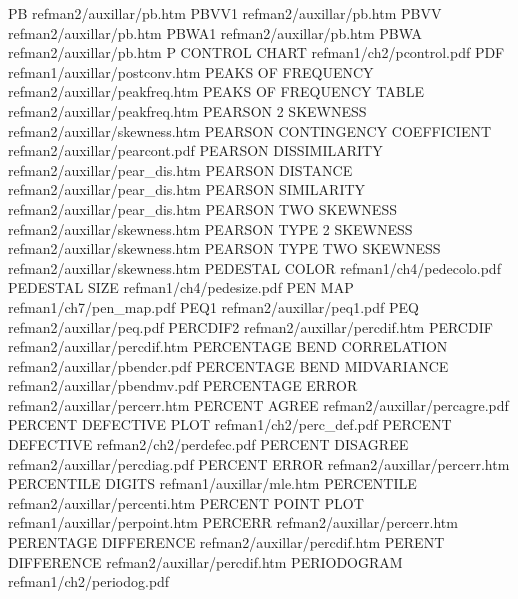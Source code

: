 PB                                      refman2/auxillar/pb.htm
PBVV1                                   refman2/auxillar/pb.htm
PBVV                                    refman2/auxillar/pb.htm
PBWA1                                   refman2/auxillar/pb.htm
PBWA                                    refman2/auxillar/pb.htm
P CONTROL CHART                         refman1/ch2/pcontrol.pdf
PDF                                     refman1/auxillar/postconv.htm
PEAKS OF FREQUENCY                      refman2/auxillar/peakfreq.htm
PEAKS OF FREQUENCY TABLE                refman2/auxillar/peakfreq.htm
PEARSON 2 SKEWNESS                      refman2/auxillar/skewness.htm
PEARSON CONTINGENCY COEFFICIENT         refman2/auxillar/pearcont.pdf
PEARSON DISSIMILARITY                   refman2/auxillar/pear_dis.htm
PEARSON DISTANCE                        refman2/auxillar/pear_dis.htm
PEARSON SIMILARITY                      refman2/auxillar/pear_dis.htm
PEARSON TWO SKEWNESS                    refman2/auxillar/skewness.htm
PEARSON TYPE 2 SKEWNESS                 refman2/auxillar/skewness.htm
PEARSON TYPE TWO SKEWNESS               refman2/auxillar/skewness.htm
PEDESTAL COLOR                          refman1/ch4/pedecolo.pdf
PEDESTAL SIZE                           refman1/ch4/pedesize.pdf
PEN MAP                                 refman1/ch7/pen_map.pdf
PEQ1                                    refman2/auxillar/peq1.pdf
PEQ                                     refman2/auxillar/peq.pdf
PERCDIF2                                refman2/auxillar/percdif.htm
PERCDIF                                 refman2/auxillar/percdif.htm
PERCENTAGE BEND CORRELATION             refman2/auxillar/pbendcr.pdf
PERCENTAGE BEND MIDVARIANCE             refman2/auxillar/pbendmv.pdf
PERCENTAGE ERROR                        refman2/auxillar/percerr.htm
PERCENT AGREE                           refman2/auxillar/percagre.pdf
PERCENT DEFECTIVE PLOT                  refman1/ch2/perc_def.pdf
PERCENT DEFECTIVE                       refman2/ch2/perdefec.pdf
PERCENT DISAGREE                        refman2/auxillar/percdiag.pdf
PERCENT ERROR                           refman2/auxillar/percerr.htm
PERCENTILE DIGITS                       refman1/auxillar/mle.htm
PERCENTILE                              refman2/auxillar/percenti.htm
PERCENT POINT PLOT                      refman1/auxillar/perpoint.htm
PERCERR                                 refman2/auxillar/percerr.htm
PERENTAGE DIFFERENCE                    refman2/auxillar/percdif.htm
PERENT DIFFERENCE                       refman2/auxillar/percdif.htm
PERIODOGRAM                             refman1/ch2/periodog.pdf
